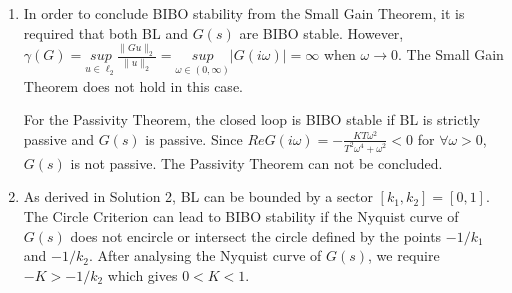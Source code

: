 \begin{enumerate}
\item In order to conclude BIBO stability from the Small Gain Theorem, it is required that both BL and $G(s)$ are BIBO stable. However, $\gamma(G)=\underset{u \in \ell_2}{sup}\frac{\|Gu\|_2}{\|u\|_2}=\underset{\omega \in (0,\infty)}{sup}|G(i\omega)|=\infty$ when $\omega \rightarrow 0$. The Small Gain Theorem does not hold in this case.

For the Passivity Theorem, the closed loop is BIBO stable if BL is strictly passive and $G(s)$ is passive. Since $ReG(i\omega)=-\frac{KT\omega^2}{T^2\omega^4+\omega^2}<0$ for $\forall \omega > 0$, $G(s)$ is not passive. The Passivity Theorem can not be concluded.    
\item As derived in Solution 2, BL can be bounded by a sector $[k_1,k_2]=[0,1]$. The Circle Criterion can lead to BIBO stability if the Nyquist curve of $G(s)$ does not encircle or intersect the circle defined by the points $-1/k_1$ and $-1/k_2$. After analysing the Nyquist curve of $G(s)$, we require $-K >-1/k_2$ which gives $0<K<1$.  

\end{enumerate}